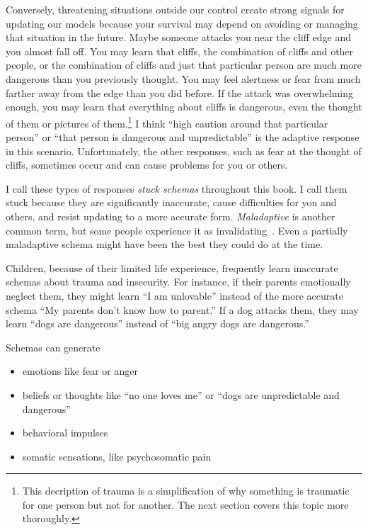\documentclass[11pt,oneside]{book}
\let\cite\parencite
\begin{document}
Conversely, threatening situations outside our control create strong signals for updating our models because your survival may depend on avoiding or managing that situation in the future. Maybe someone attacks you near the cliff edge and you almost fall off. You may learn that cliffs, the combination of cliffs and other people, or the combination of cliffs and just that particular person are much more dangerous than you previously thought. You may feel alertness or fear from much farther away from the edge than you did before. If the attack was overwhelming enough, you may learn that everything about cliffs is dangerous, even the thought of them or pictures of them.\footnote{This decription of trauma is a simplification of why something is traumatic for one person but not for another. The next section covers this topic more thoroughly.} I think \enquote{high caution around that particular person} or \enquote{that person is dangerous and unpredictable} is the adaptive response in this scenario. Unfortunately, the other responses, such as fear at the thought of cliffs, sometimes occur and can cause problems for you or others.

I call these types of responses \textit{stuck schemas} throughout this book. I call them stuck because they are significantly inaccurate, cause difficulties for you and others, and resist updating to a more accurate form. \textit{Maladaptive} is another common term, but some people experience it as invalidating~\cite{eckerUnlocking}. Even a partially maladaptive schema might have been the best they could do at the time.

Children, because of their limited life experience, frequently learn inaccurate schemas about trauma and insecurity. For instance, if their parents emotionally neglect them, they might learn \enquote{I am unlovable} instead of the more accurate schema \enquote{My parents don't know how to parent.} If a dog attacks them, they may learn \enquote{dogs are dangerous} instead of \enquote{big angry dogs are dangerous.}

Schemas can generate~\cite{eckerUnlocking}
\begin{itemize}
	\item emotions like fear or anger
	\item beliefs or thoughts like \enquote{no one loves me} or \enquote{dogs are unpredictable and dangerous}
	\item behavioral impulses
	\item somatic sensations, like psychosomatic pain
\end{itemize}
\end{document}
